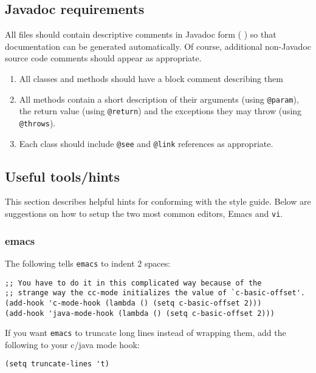 \subsection {Javadoc requirements}

All files should contain descriptive comments
in Javadoc\TMweb{} form (
\xlink{{\tt \JavadocURL}} {\JavadocURL}
) so
that documentation can be generated automatically.  Of course,
additional non-Javadoc source code comments should appear as
appropriate.

\begin{enumerate}
\item All classes and methods should have a block comment describing
them
\item All methods contain a short description of their arguments
(using {\tt @param}), the return value (using {\tt @return}) and the
exceptions they may throw (using {\tt @throws}).
\item Each class should include {\tt @see} and {\tt @link} 
references as appropriate.
\end{enumerate}

\subsection {Useful tools/hints}%

This section describes helpful hints for conforming with the style
guide.  Below are suggestions on how to setup the two most common
editors, Emacs and \texttt{vi}. 

\subsubsection{emacs} 

The following tells {\tt emacs} to indent 2 spaces:
\begin{verbatim}
;; You have to do it in this complicated way because of the
;; strange way the cc-mode initializes the value of `c-basic-offset'.
(add-hook 'c-mode-hook (lambda () (setq c-basic-offset 2)))
(add-hook 'java-mode-hook (lambda () (setq c-basic-offset 2)))
\end{verbatim}
If you want {\tt emacs} to truncate long lines instead of wrapping them, add
the following to your c/java mode hook:
\begin{verbatim}
(setq truncate-lines 't)
\end{verbatim}

